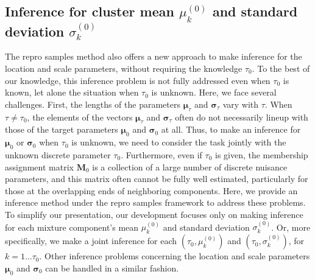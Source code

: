 \documentclass[12pt]{article}
\theoremstyle{shortspace}
\def\*#1{\bm{#1}}
\begin{document}
\subsection{\hspace{-3mm}Inference for cluster mean $\mu_k^{(0)}$ and standard deviation $\sigma_k^{(0)}$ }\label{sec:mu-sigma}

The repro samples method also offers a new approach to make inference for the 
location and scale parameters, without requiring the knowledge $\tau_0.$ 
To the best of our knowledge, this inference problem is not fully addressed even when $\tau_0$ is known, let alone the situation when $\tau_0$ is unknown. Here, 
we face several 
challenges. 
First, the lengths of the parameters ${\*\mu}_\tau$ and $\*\sigma_\tau$ vary with $\tau$. When $\tau \not = \tau_0$, the elements of the vectors  ${\*\mu}_\tau$ and ${\*\sigma}_\tau$ often do not necessarily lineup with those of the target parameters ${\*\mu}_0$ and $\*\sigma_0$ at all. 
Thus, to make an inference for $\*\mu_{0}$ or $\*\sigma_{0}$ when $\tau_0$ is unknown, we need to consider the task jointly with the unknown discrete parameter $\tau_0$. 
Furthermore, even if $\tau_0$ is given, the membership assignment matrix $\*M_0$ is a collection of a large number of discrete nuisance parameters, and this matrix often cannot be fully well estimated, particularly for those at the overlapping ends of neighboring components. 
Here,
we provide an inference method under the repro samples framework to address these problems. 
To simplify our presentation, our development focuses only on making inference 
for each mixture component's mean $\mu_k^{(0)}$ and standard deviation $\sigma_k^{(0)}$. Or, more specifically, we make a joint inference for each $(\tau_0, \mu_k^{(0)})$ and   $(\tau_0, \sigma_k^{(0)})$, for $k=1 \dots \tau_0$.  Other inference problems concerning the location and scale parameters $\*\mu_0$ and $\*\sigma_0$ can be handled in a  similar fashion. 
\end{document}
